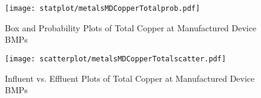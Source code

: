         \begin{figure}[hb]   %
            \centering
            \texttt{[image: statplot/metalsMDCopperTotalprob.pdf]}
            \caption{Box and Probability Plots of Total Copper at Manufactured Device BMPs}
        \end{figure}         %
        
        
        \begin{figure}[hb]   %
            \centering
            \texttt{[image: scatterplot/metalsMDCopperTotalscatter.pdf]}
            \caption{Influent vs. Effluent Plots of Total Copper at Manufactured Device BMPs}
        \end{figure}         %
        \clearpage
        